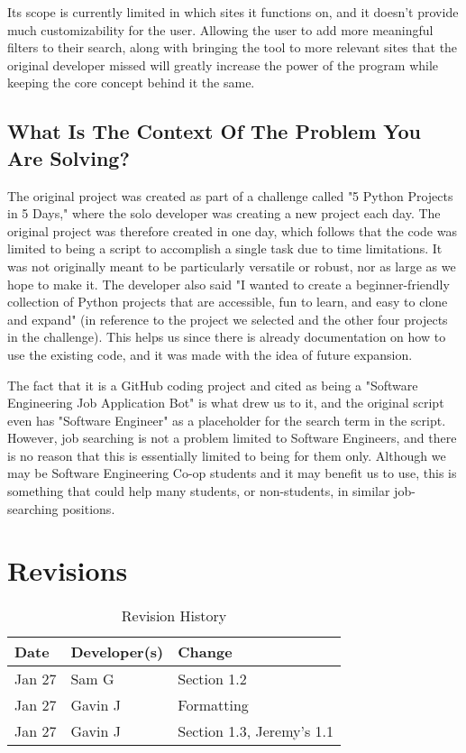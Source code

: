 \documentclass{article}
\begin{document}
Its scope is currently limited in which sites it functions on, and it doesn’t provide much 
customizability for the user. Allowing the user to add more meaningful filters to their search, 
along with bringing the tool to more relevant sites that the original developer missed will 
greatly increase the power of the program while keeping the core concept behind it the same.

\subsection{What Is The Context Of The Problem You Are Solving?}
The original project was created as part of a challenge called "5 Python Projects in 5 Days," where the solo developer was creating a new project each day. The original project was therefore created in one day, which follows that the code was limited to being a script to accomplish a single task due to time limitations. It was not originally meant to be particularly versatile or robust, nor as large as we hope to make it. The developer also said "I wanted to create a beginner-friendly collection of Python projects that are accessible, fun to learn, and easy to clone and expand" (in reference to the project we selected and the other four projects in the challenge). This helps us since there is already documentation on how to use the existing code, and it was made with the idea of future expansion.

The fact that it is a GitHub coding project and cited as being a "Software Engineering Job Application Bot" is what drew us to it, and the original script even has "Software Engineer" as a placeholder for the search term in the script. However, job searching is not a problem limited to Software Engineers, and there is no reason that this is essentially limited to being for them only. Although we may be Software Engineering Co-op students and it may benefit us to use, this is something that could help many students, or non-students, in similar job-searching positions.


\section{Revisions}

\begin{table}[hp]
\caption{Revision History} \label{TblRevisionHistory}
\begin{tabularx}{\textwidth}{llX}
\toprule
\textbf{Date} & \textbf{Developer(s)} & \textbf{Change}\\
\midrule
Jan 27 & Sam G & Section 1.2\\
Jan 27 & Gavin J & Formatting\\
Jan 27 & Gavin J & Section 1.3, Jeremy's 1.1\\
\bottomrule
\end{tabularx}
\end{table}



\iffalse
\wss{comment}
\ds{comment}
\mj{comment}
\cm{comment}
\mh{comment}
\fi
\end{document}
